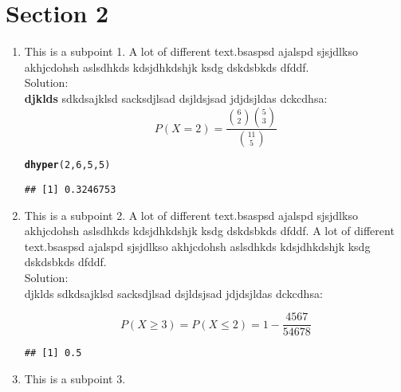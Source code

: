 \documentclass{article}\usepackage[]{graphicx}\usepackage[]{color}
\makeatletter
\newcommand{\hlnum}[1]{\textcolor[rgb]{0.686,0.059,0.569}{#1}}%
\newcommand{\hlstd}[1]{\textcolor[rgb]{0.345,0.345,0.345}{#1}}%
\newcommand{\hlkwd}[1]{\textcolor[rgb]{0.737,0.353,0.396}{\textbf{#1}}}%
\newenvironment{kframe}{%
 \def\at@end@of@kframe{}%
 \ifinner\ifhmode%
  \def\at@end@of@kframe{\end{minipage}}%
  \begin{minipage}{\columnwidth}%
 \fi\fi%
 \def\FrameCommand##1{\hskip\@totalleftmargin \hskip-\fboxsep
 \colorbox{shadecolor}{##1}\hskip-\fboxsep
     \hskip-\linewidth \hskip-\@totalleftmargin \hskip\columnwidth}%
 \MakeFramed {\advance\hsize-\width
   \@totalleftmargin\z@ \linewidth\hsize
   \@setminipage}}%
 {\par\unskip\endMakeFramed%
 \at@end@of@kframe}
\newenvironment{knitrout}{}{} %
\makeatother
\begin{document}
\section{Section 2}
\begin{enumerate}
  \item This is a subpoint 1. A lot of different text.bsaspsd ajalspd sjsjdlkso akhjcdohsh aslsdhkds kdsjdhkdshjk ksdg dskdsbkds dfddf. \\

Solution: \\
\textbf{djklds } sdkdsajklsd sacksdjlsad dsjldsjsad jdjdsjldas dckcdhsa:
\[
P(X=2)=\frac{{6 \choose 2}{5 \choose 3}}{{11 \choose 5}}
\]

\begin{knitrout}
\color{fgcolor}\begin{kframe}
\begin{alltt}
\hlkwd{dhyper}\hlstd{(}\hlnum{2}\hlstd{,} \hlnum{6}\hlstd{,} \hlnum{5}\hlstd{,} \hlnum{5}\hlstd{)}
\end{alltt}
\begin{verbatim}
## [1] 0.3246753
\end{verbatim}
\end{kframe}
\end{knitrout}

  \item This is a subpoint 2. A lot of different text.bsaspsd ajalspd sjsjdlkso akhjcdohsh aslsdhkds kdsjdhkdshjk ksdg dskdsbkds dfddf. A lot of different text.bsaspsd ajalspd sjsjdlkso akhjcdohsh aslsdhkds kdsjdhkdshjk ksdg dskdsbkds dfddf. \\
  
  
Solution: \\
djklds sdkdsajklsd sacksdjlsad dsjldsjsad jdjdsjldas dckcdhsa:

\[
P(X \ge 3)=P(X \le 2)=1-\frac{4567}{54678}
\]

\begin{knitrout}
\color{fgcolor}\begin{kframe}
\begin{verbatim}
## [1] 0.5
\end{verbatim}
\end{kframe}
\end{knitrout}

  \item This is a subpoint 3.
\end{enumerate}
\end{document}
